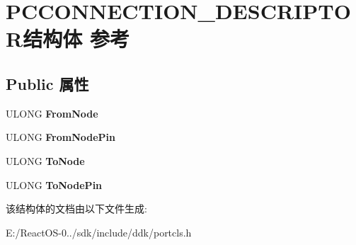 \hypertarget{struct_p_c_c_o_n_n_e_c_t_i_o_n___d_e_s_c_r_i_p_t_o_r}{}\section{P\+C\+C\+O\+N\+N\+E\+C\+T\+I\+O\+N\+\_\+\+D\+E\+S\+C\+R\+I\+P\+T\+O\+R结构体 参考}
\label{struct_p_c_c_o_n_n_e_c_t_i_o_n___d_e_s_c_r_i_p_t_o_r}
\subsection*{Public 属性}
\begin{DoxyCompactItemize}
\item 
\mbox{\label{struct_p_c_c_o_n_n_e_c_t_i_o_n___d_e_s_c_r_i_p_t_o_r_a45d8fddc83e118f985724781ef4792d4}} 
U\+L\+O\+NG {\bfseries From\+Node}
\item 
\mbox{\label{struct_p_c_c_o_n_n_e_c_t_i_o_n___d_e_s_c_r_i_p_t_o_r_ab2d013cb19211b41dc35fb88722a0e38}} 
U\+L\+O\+NG {\bfseries From\+Node\+Pin}
\item 
\mbox{\label{struct_p_c_c_o_n_n_e_c_t_i_o_n___d_e_s_c_r_i_p_t_o_r_adbadb83e6c10352fccf877963cc10ed2}} 
U\+L\+O\+NG {\bfseries To\+Node}
\item 
\mbox{\label{struct_p_c_c_o_n_n_e_c_t_i_o_n___d_e_s_c_r_i_p_t_o_r_a35d92943bfcb8a472467c24faf85f6f5}} 
U\+L\+O\+NG {\bfseries To\+Node\+Pin}
\end{DoxyCompactItemize}


该结构体的文档由以下文件生成\+:\begin{DoxyCompactItemize}
\item 
E\+:/\+React\+O\+S-\/0../sdk/include/ddk/portcls.\+h\end{DoxyCompactItemize}
